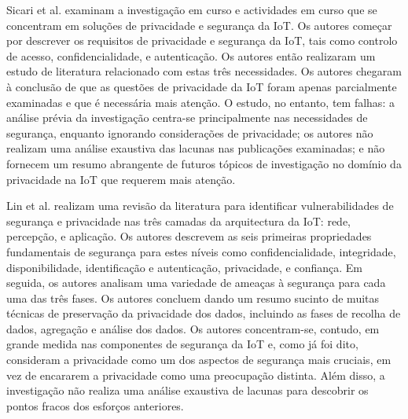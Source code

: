 \documentclass[conference]{IEEEtran}
\begin{document}
Sicari et al. \cite{sicari2015security} examinam a investigação em curso
e actividades em curso que se concentram em soluções de privacidade e segurança
da IoT. Os autores começar por descrever os requisitos de privacidade e
segurança da IoT, tais como controlo de acesso, confidencialidade, e autenticação.
Os autores então realizaram um estudo de literatura relacionado com estas
três necessidades. Os autores chegaram à conclusão de que as questões de
privacidade da IoT foram apenas parcialmente examinadas e que é necessária
mais atenção. O estudo, no entanto, tem falhas: a análise prévia da investigação
centra-se principalmente nas necessidades de segurança, enquanto ignorando
considerações de privacidade; os autores não realizam uma análise exaustiva
das lacunas nas publicações examinadas; e não fornecem um resumo abrangente
de futuros tópicos de investigação no domínio da privacidade na IoT que requerem
mais atenção.


Lin et al. \cite{LinSurvey} realizam uma revisão da literatura para identificar
vulnerabilidades de segurança e privacidade nas três camadas da arquitectura
da IoT: rede, percepção, e aplicação. Os autores descrevem as seis primeiras
propriedades fundamentais de segurança para estes níveis como confidencialidade,
integridade, disponibilidade, identificação e autenticação, privacidade,
e confiança. Em seguida, os autores analisam uma variedade de ameaças à segurança
para cada uma das três fases. Os autores concluem dando um resumo sucinto
de muitas técnicas de preservação da privacidade dos dados, incluindo as
fases de recolha de dados, agregação e análise dos dados. Os autores concentram-se,
contudo, em grande medida nas componentes de segurança da IoT e, como já
foi dito, consideram a privacidade como um dos aspectos de segurança mais
cruciais, em vez de encararem a privacidade como uma preocupação distinta.
Além disso, a investigação não realiza uma análise exaustiva de lacunas para
descobrir os pontos fracos dos esforços anteriores.
\end{document}
